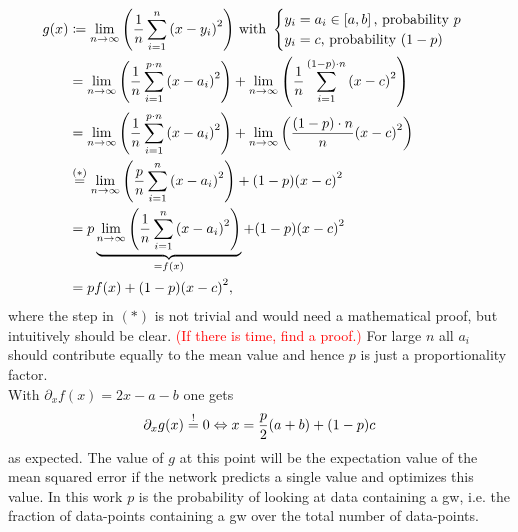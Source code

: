 \begin{align}
g(x) & \coloneqq\lim_{n\to\infty}{\left( \frac{1}{n}\sum_{i=1}^{n}{\left( x-y_i \right)}^2 \right)}\text{ with }
\begin{cases}
	y_i=a_i\in\left[a,b\right]\text{, probability }p\\
	y_i=c\text{, probability }(1-p)
\end{cases}\nonumber\\
& = \lim_{n\to\infty}{\left( \frac{1}{n}\sum_{i=1}^{p\cdot n}{\left( x-a_i \right)}^2 \right)}+\lim_{n\to\infty}{\left( \frac{1}{n}\sum_{i=1}^{(1-p)\cdot n}{\left( x-c \right)}^2 \right)}\nonumber\\
& = \lim_{n\to\infty}{\left( \frac{1}{n}\sum_{i=1}^{p\cdot n}{\left( x-a_i \right)}^2 \right)}+\lim_{n\to\infty}{\left( \frac{(1-p)\cdot n}{n}{\left( x-c \right)}^2 \right)}\nonumber\\
& \overset{(\ast)}{=} \lim_{n\to\infty}{\left( \frac{p}{n}\sum_{i=1}^{n}{\left( x-a_i \right)}^2 \right)}+(1-p){\left( x-c \right)}^2\nonumber\\
& = p\underbrace{\lim_{n\to\infty}{\left( \frac{1}{n}\sum_{i=1}^{n}{\left( x-a_i \right)}^2 \right)}}_{=f(x)}+(1-p){\left( x-c \right)}^2\nonumber\\
& = p f(x) + (1-p){\left( x-c \right)}^2,
\end{align}
where the step in $(\ast)$ is not trivial and would need a mathematical proof, but intuitively should be clear. \textcolor{red}{(If there is time, find a proof.)} For large $n$ all $a_i$ should contribute equally to the mean value and hence $p$ is just a proportionality factor.\\
With $\partial_x f(x)=2x-a-b$ one gets
\begin{equation}
\partial_x g(x) \overset{!}{=} 0 \Leftrightarrow x = \frac{p}{2}{\left( a+b \right)}+{\left( 1-p \right)}c
\end{equation}
as expected. The value of $g$ at this point will be the expectation value of the mean squared error if the network predicts a single value and optimizes this value. In this work $p$ is the probability of looking at data containing a \gls{gw}, i.e. the fraction of data-points containing a \gls{gw} over the total number of data-points.

